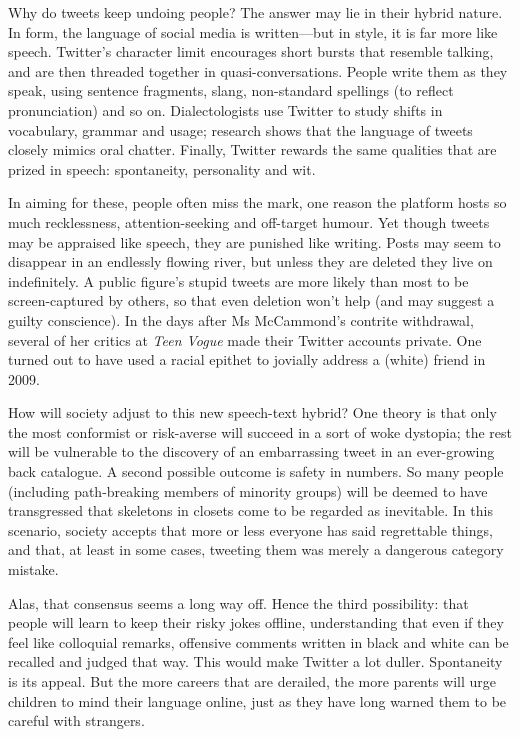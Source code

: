 \documentclass{article}
\begin{document}
Why do tweets keep undoing people? The answer may lie in their hybrid nature. In form, the language of social media is written---but in style, it is far more like speech. Twitter's character limit encourages short bursts that resemble talking, and are then threaded together in quasi-conversations. People write them as they speak, using sentence fragments, slang, non-standard spellings (to reflect pronunciation) and so on. Dialectologists use Twitter to study shifts in vocabulary, grammar and usage; research shows that the language of tweets closely mimics oral chatter. Finally, Twitter rewards the same qualities that are prized in speech: spontaneity, personality and wit. 

In aiming for these, people often miss the mark, one reason the platform hosts so much recklessness, attention-seeking and off-target humour. Yet though tweets may be appraised like speech, they are punished like writing. Posts may seem to disappear in an endlessly flowing river, but unless they are deleted they live on indefinitely. A public figure's stupid tweets are more likely than most to be screen-captured by others, so that even deletion won't help (and may suggest a guilty conscience). In the days after Ms McCammond's contrite withdrawal, several of her critics at \emph{Teen Vogue} made their Twitter accounts private. One turned out to have used a racial epithet to jovially address a (white) friend in 2009. 

How will society adjust to this new speech-text hybrid? One theory is that only the most conformist or risk-averse will succeed in a sort of woke dystopia; the rest will be vulnerable to the discovery of an embarrassing tweet in an ever-growing back catalogue. A second possible outcome is safety in numbers. So many people (including path-breaking members of minority groups) will be deemed to have transgressed that skeletons in closets come to be regarded as inevitable. In this scenario, society accepts that more or less everyone has said regrettable things, and that, at least in some cases, tweeting them was merely a dangerous category mistake. 

Alas, that consensus seems a long way off. Hence the third possibility: that people will learn to keep their risky jokes offline, understanding that even if they feel like colloquial remarks, offensive comments written in black and white can be recalled and judged that way. This would make Twitter a lot duller. Spontaneity is its appeal. But the more careers that are derailed, the more parents will urge children to mind their language online, just as they have long warned them to be careful with strangers. 
\end{document}
